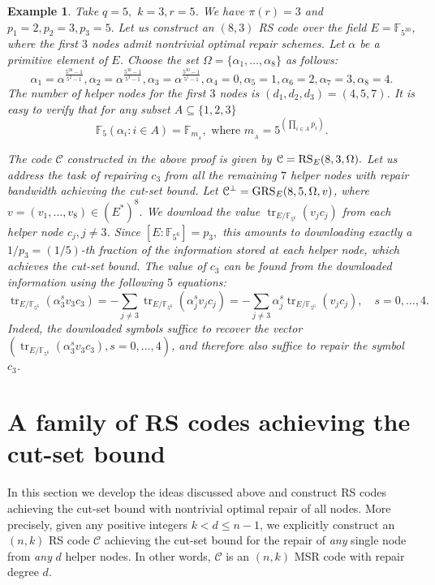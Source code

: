 \documentclass[11pt,onecolumn]{IEEEtran}
\newtheorem{example}{Example}
\newcommand{\cC}{\mathcal{C}}
\DeclareMathOperator{\trace}{tr}
\begin{document}
\begin{example} Take $q=5,$ $k=3,r=5$. We have $\pi(r)=3$ and $p_1=2, p_2=3, p_3=5.$ 
Let us construct an $(8,3)$ RS code over the field $E=\mathbb{F}_{5^{30}}$, where the first $3$ nodes admit  nontrivial optimal repair schemes. Let  $\alpha$ be a primitive element of $E$. Choose the set $\Omega=\{\alpha_1,\dots,\alpha_8\}$ as follows:
   $$\alpha_1=\alpha^{\frac{5^{30}-1}{5^2-1}},\alpha_2=\alpha^{\frac{5^{30}-1}{5^3-1}},\alpha_3=\alpha^{\frac{5^{30}-1}{5^5-1}},\alpha_4=0,\alpha_5=1,\alpha_6=2,\alpha_7=3,\alpha_8=4.
   $$
  The number of helper nodes for the first $3$ nodes is $(d_1,d_2,d_3)=(4,5,7)$.
It is easy to verify that for any subset  $A\subseteq \{1,2,3\}$
$$ \mathbb{F}_5(\alpha_i:i\in A)=\mathbb{F}_{m_{\!_A}}, \text{ where } m_{_A}=5^{(\prod_{i\in A}p_i)}.$$

The code $\cC$ constructed in the above proof is given by $\cC=\text{\rm RS}_E(8, 3,\Omega).$ Let us address the task
of repairing $c_3$ from all the remaining $7$ helper nodes with repair bandwidth achieving the cut-set bound.
Let $\cC^\bot=\text{\rm GRS}_E(8, 5,\Omega,v)$, where 
$v=(v_1,\dots,v_8)\in (E^\ast)^8$.
We download the value $\trace_{E/\mathbb{F}_{5^{6}}}(v_jc_j)$ from each helper node $c_j,j\neq 3$.
Since $[E:\mathbb{F}_{5^{6}}]=p_3,$ this amounts to downloading exactly a $1/p_3=(1/5)$-th fraction
of the information stored at each helper node, which achieves the cut-set bound.
The value of $c_3$ can be found from the downloaded information using the following $5$ equations: 
    $$
  \trace_{E/\mathbb{F}_{5^{6}}}(\alpha_3^s v_3c_3) =
 - \sum_{j\neq 3}\trace_{E/\mathbb{F}_{5^{6}}}(\alpha_j^s v_jc_j)=
 - \sum_{j\neq 3}\alpha_j^s\trace_{E/\mathbb{F}_{5^{6}}}(v_jc_j)
, \quad  s=0,\dots,4.
$$ 
Indeed, the downloaded symbols suffice to recover the vector $(\trace_{E/\mathbb{F}_{5^{6}}}(\alpha_3^s v_3c_3),{s=0,\dots,4})$, and
therefore also suffice to repair the symbol $c_3$. 
\end{example}	


\section{A family of RS codes achieving the cut-set bound}\label{Sect:cons}

In this section we develop the ideas discussed above and construct  RS codes achieving the cut-set bound with
nontrivial optimal repair of all nodes. More precisely, given any positive integers $k< d \leq n-1$, we explicitly construct an $(n,k)$ RS code $\cC$ achieving the cut-set bound for the repair of {\em any} single node from {\em any} $d$ helper nodes. In other words, $\cC$ is an $(n,k)$ MSR code with repair degree $d$.
\end{document}
